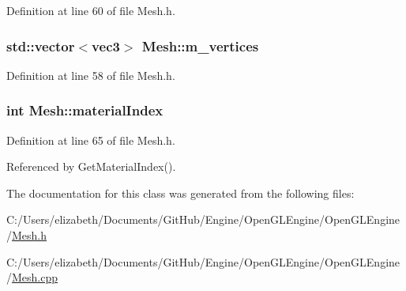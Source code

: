 Definition at line 60 of file Mesh.\+h.

\subsubsection[{\texorpdfstring{m\+\_\+vertices}{m_vertices}}]{\setlength{\rightskip}{0pt plus 5cm}std\+::vector$<${\bf vec3}$>$ Mesh\+::m\+\_\+vertices\hspace{0.3cm}{\ttfamily [private]}}\hypertarget{class_mesh_acdb6a67de9921b11a4f091288c4a1504}{}\label{class_mesh_acdb6a67de9921b11a4f091288c4a1504}


Definition at line 58 of file Mesh.\+h.

\subsubsection[{\texorpdfstring{material\+Index}{materialIndex}}]{\setlength{\rightskip}{0pt plus 5cm}int Mesh\+::material\+Index\hspace{0.3cm}{\ttfamily [private]}}\hypertarget{class_mesh_a20c05451817a9fb9a67e07b1f2f88163}{}\label{class_mesh_a20c05451817a9fb9a67e07b1f2f88163}


Definition at line 65 of file Mesh.\+h.



Referenced by Get\+Material\+Index().



The documentation for this class was generated from the following files\+:\begin{DoxyCompactItemize}
\item 
C\+:/\+Users/elizabeth/\+Documents/\+Git\+Hub/\+Engine/\+Open\+G\+L\+Engine/\+Open\+G\+L\+Engine/\hyperlink{_mesh_8h}{Mesh.\+h}\item 
C\+:/\+Users/elizabeth/\+Documents/\+Git\+Hub/\+Engine/\+Open\+G\+L\+Engine/\+Open\+G\+L\+Engine/\hyperlink{_mesh_8cpp}{Mesh.\+cpp}\end{DoxyCompactItemize}

